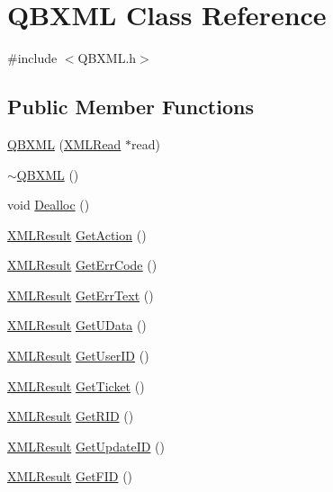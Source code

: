 \hypertarget{class_q_b_x_m_l}{}\section{Q\+B\+X\+M\+L Class Reference}
\label{class_q_b_x_m_l}


{\ttfamily \#include $<$Q\+B\+X\+M\+L.\+h$>$}

\subsection*{Public Member Functions}
\begin{DoxyCompactItemize}
\item 
\hyperlink{class_q_b_x_m_l_ad5d7e15c9c1d968f57e681e7c5cb6c04}{Q\+B\+X\+M\+L} (\hyperlink{class_x_m_l_read}{X\+M\+L\+Read} $\ast$read)
\item 
\hyperlink{class_q_b_x_m_l_a29b25b0d79351ec8498aeca770cf854f}{$\sim$\+Q\+B\+X\+M\+L} ()
\item 
void \hyperlink{class_q_b_x_m_l_a146d1f5ee8f24fce540eb1c1f4c20ee9}{Dealloc} ()
\item 
\hyperlink{struct_x_m_l_result}{X\+M\+L\+Result} \hyperlink{class_q_b_x_m_l_a7a110dde5772b961ca6c572b4caaca8b}{Get\+Action} ()
\item 
\hyperlink{struct_x_m_l_result}{X\+M\+L\+Result} \hyperlink{class_q_b_x_m_l_a0acf0bdc0f8b865d9016510057816ecf}{Get\+Err\+Code} ()
\item 
\hyperlink{struct_x_m_l_result}{X\+M\+L\+Result} \hyperlink{class_q_b_x_m_l_a77cd91afd92fe8fe4861269eabed85e8}{Get\+Err\+Text} ()
\item 
\hyperlink{struct_x_m_l_result}{X\+M\+L\+Result} \hyperlink{class_q_b_x_m_l_a58b44d06a90f3a0012d0c3e77b30720c}{Get\+U\+Data} ()
\item 
\hyperlink{struct_x_m_l_result}{X\+M\+L\+Result} \hyperlink{class_q_b_x_m_l_ae8f688578c62d3e12939c0a1d7246073}{Get\+User\+I\+D} ()
\item 
\hyperlink{struct_x_m_l_result}{X\+M\+L\+Result} \hyperlink{class_q_b_x_m_l_ac0fc9a0151377c29c8c2f864aef82ff7}{Get\+Ticket} ()
\item 
\hyperlink{struct_x_m_l_result}{X\+M\+L\+Result} \hyperlink{class_q_b_x_m_l_a08fa0b97fcc3feac3b41db1ce3aa1d37}{Get\+R\+I\+D} ()
\item 
\hyperlink{struct_x_m_l_result}{X\+M\+L\+Result} \hyperlink{class_q_b_x_m_l_a014c3f5b93eac9afaa2c6815a35c2583}{Get\+Update\+I\+D} ()
\item 
\hyperlink{struct_x_m_l_result}{X\+M\+L\+Result} \hyperlink{class_q_b_x_m_l_a1f8ba59f5ee8ff09c0bfee29586c92d6}{Get\+F\+I\+D} ()

\end{DoxyCompactItemize}
